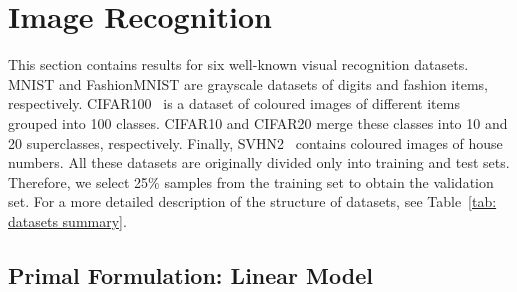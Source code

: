 \section{Image Recognition}

This section contains results for six well-known visual recognition datasets. MNIST \cite{deng2012mnist} and FashionMNIST \cite{xiao2017fashionmnist} are grayscale datasets of digits and fashion items, respectively. CIFAR100~\cite{krizhevsky2009learning} is a dataset of coloured images of different items grouped into 100 classes. CIFAR10 and CIFAR20 merge these classes into 10 and 20 superclasses, respectively. Finally, SVHN2~\cite{netzer2011reading} contains coloured images of house numbers. All these datasets are originally divided only into training and test sets. Therefore, we select 25\% samples from the training set to obtain the validation set. For a more detailed description of the structure of datasets, see Table~\ref{tab: datasets summary}.


\subsection{Primal Formulation: Linear Model}\label{sec: results primal linear}

